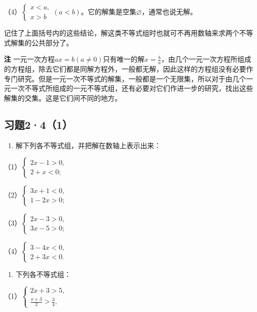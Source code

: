 （4）\(\left\{ \begin{array}{l} x < a, \\ x > b \end{array} \right. (a < b)\)。它的解集是空集\(\varnothing\)，通常也说无解。

记住了上面括号内的这些结论，解这类不等式组时也就可不再用数轴来求两个不等式解集的公共部分了。

\textbf{注}
一元一次方程\(ax = b (a \neq 0)\)只有唯一的解\(x = \frac{b}{a}\)，由几个一元一次方程所组成的方程组，除去它们都是同解方程外，一般都无解，因此这样的方程组没有必要作专门研究。但是一元一次不等式的解集，一般都是一个无限集，所以对于由几个一元一次不等式所组成的一元不等式组，还有必要对它们作进一步的研究，找出这些解集的交集。这是它们间不同的地方。

\subsection{习题2·4（1）}

\begin{enumerate}
\item
  解下列各不等式组，并把解在数轴上表示出来：
\end{enumerate}

（1）\(\left\{ \begin{array}{l} 2x - 1 > 0, \\ 2 + x < 0; \end{array} \right.\)

（2）\(\left\{ \begin{array}{l} 3x + 1 < 0, \\ 1 - 2x > 0; \end{array} \right.\)

（3）\(\left\{ \begin{array}{l} 2x - 3 > 0, \\ 3x - 5 > 0; \end{array} \right.\)

（4）\(\left\{ \begin{array}{l} 3 - 4x < 0, \\ 2 + 3x < 0. \end{array} \right.\)

\begin{enumerate}[start=2]
\item
  下列各不等式组：
\end{enumerate}

（1）\(\left\{ \begin{array}{l} 2x + 3 > 5, \\ \frac{x+3}{2} > \frac{3}{4}, \end{array} \right.\)

